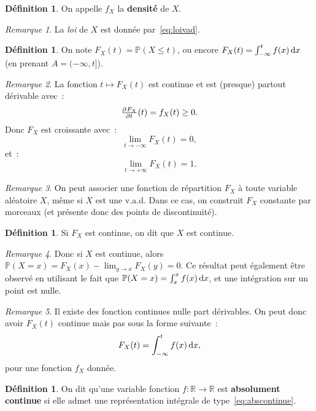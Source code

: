 \documentclass{article}
\renewcommand{\P}{\mathbb P}
\newcommand{\R}{\mathbb R}
\theoremstyle{definition}
\newtheorem{déf}[thm]{Définition}
\theoremstyle{remark}
\newtheorem*{rmq}{Remarque}
\begin{document}
		\begin{déf} On appelle $f_X$ la \textbf{densité} de $X$. \end{déf}

		\begin{rmq} La \textit{loi} de $X$ est donnée par~\eqref{eq:loivad}. \end{rmq}

		\begin{déf} On note $F_X(t) = \P(X \leq t)$, ou encore $F_X(t) = \int_{-\infty}^tf(x)\dif x$ (en prenant $A = (-\infty, t]$). \end{déf}

		\begin{rmq} La fonction $t \mapsto F_X(t)$ est continue et est (presque) partout dérivable avec~:
		\[\pd{F_X}t(t) = f_X(t) \geq 0.\]
		Donc $F_X$ est croissante avec~:
		\[\lim_{t \to -\infty}F_X(t) = 0,\]
		et~:
		\[\lim_{t \to +\infty}F_X(t) = 1.\]
		\end{rmq}

		\begin{rmq} On peut associer une fonction de répartition $F_X$ à toute variable aléatoire $X$, même si $X$ est une v.a.d. Dans ce cas, on construit $F_X$
		constante par morceaux (et présente donc des points de discontinuité). \end{rmq}

		\begin{déf} Si $F_X$ est continue, on dit que $X$ est continue. \end{déf}

		\begin{rmq} Donc si $X$ est continue, alors $\P(X = x) = F_X(x) - \lim_{y \to x}F_X(y) = 0$. Ce résultat peut également être observé en utilisant le fait
		que $\P(X = x) = \int_x^x f(x)\dif x$, et une intégration sur un point est nulle. \end{rmq}

		\begin{rmq} Il existe des fonction continues nulle part dérivables. On peut donc avoir $F_X(t)$ continue mais pas sous la forme suivante~:
		\begin{equation}\label{eq:abscontinue}
			F_X(t) = \int_{-\infty}^tf(x)\dif x,
		\end{equation}
		pour une fonction $f_X$ donnée.
		\end{rmq}

		\begin{déf} On dit qu'une variable fonction $f : \R \to \R$ est \textbf{absolument continue} si elle admet une représentation intégrale de
		type~\eqref{eq:abscontinue}. \end{déf}
\end{document}
